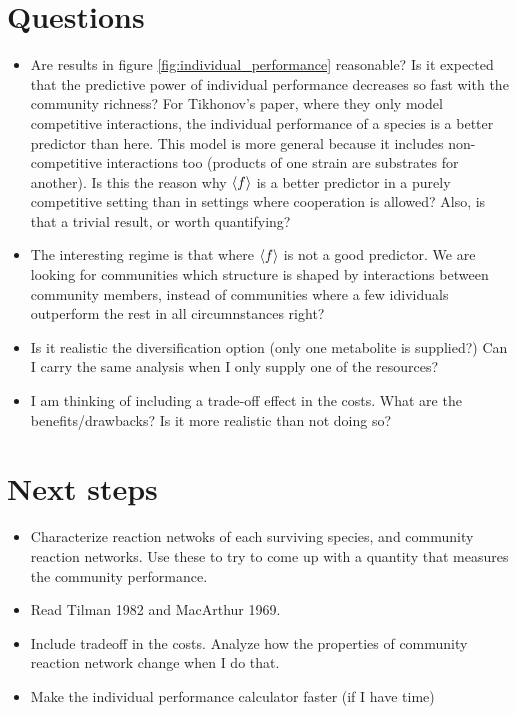 \documentclass[10pt,letterpaper]{article}
\begin{document}
    \section*{Questions}
	\begin{itemize}
	   \item Are results in figure \ref{fig:individual_performance} reasonable? Is it expected that the predictive power of individual performance decreases so fast with the community richness? For Tikhonov's paper, where they only  model competitive interactions, the individual performance of a species is a better predictor than here. This model is more general because it includes non-competitive interactions too (products of one strain are substrates for another). Is this the reason why $ \braket{f} $ is a better predictor in a purely competitive setting than in settings where cooperation is allowed? Also, is that a trivial result, or worth quantifying? 
	   \item The interesting regime is that where $ \braket{f} $ is not a good predictor. We are looking for communities which structure is shaped by interactions between community members, instead of communities where a few idividuals outperform the rest in all circumnstances right?
	   \item Is it realistic the diversification option (only one metabolite is supplied?) Can I carry the same analysis when I only supply one of the resources?
	   \item I am thinking of including a trade-off effect in the costs. What are the benefits/drawbacks? Is it more realistic than not doing so?
	\end{itemize}

	\section*{Next steps}
		\begin{itemize}
			\item Characterize reaction netwoks of each surviving species, and community reaction networks. Use these to try to come up with a quantity that measures the community performance. 
			\item Read Tilman 1982 and MacArthur 1969.	
			\item Include tradeoff in the costs. Analyze how the properties of community reaction network change when I do that. 
			\item Make the individual performance calculator faster (if I have time)
		\end{itemize}
	
		
		
\end{document}
